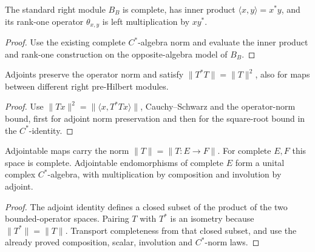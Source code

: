 \begin{proposition}\label{prop:standard-module-rank-one}
\leanok
The standard right module $B_B$ is complete, has inner product
$\langle x,y\rangle=x^*y$, and its rank-one operator $\theta_{x,y}$ is left
multiplication by $xy^*$.
\end{proposition}
\begin{proof}
\leanok
Use the existing complete $C^*$-algebra norm and evaluate the inner product
and rank-one construction on the opposite-algebra model of $B_B$.
\end{proof}

\begin{proposition}\label{prop:adjointable-module-norms}
\leanok
Adjoints preserve the operator norm and satisfy $\|T^*T\|=\|T\|^2$,
also for maps between different right pre-Hilbert modules.
\end{proposition}
\begin{proof}\leanok
Use $\|Tx\|^2=\|\langle x,T^*Tx\rangle\|$, Cauchy--Schwarz and the
operator-norm bound, first for adjoint norm preservation and then for the
square-root bound in the $C^*$-identity.
\end{proof}

\begin{proposition}\label{prop:complete-adjointable-algebra}
\leanok
Adjointable maps carry the norm $\|T\|=\|T:E\to F\|$.
For complete $E,F$ this space is complete. Adjointable endomorphisms of
complete $E$ form a unital complex $C^*$-algebra, with multiplication by
composition and involution by adjoint.
\end{proposition}
\begin{proof}\leanok
The adjoint identity defines a closed subset of the product of the two
bounded-operator spaces. Pairing $T$ with $T^*$ is an isometry because
$\|T^*\|=\|T\|$. Transport completeness from that closed subset, and use
the already proved composition, scalar, involution and $C^*$-norm laws.
\end{proof}

